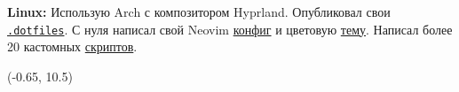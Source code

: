\documentclass[margin,line]{resume}
\begin{document}
\begin{resume}
  \vspace{-6mm}

  \textbf{Linux:} Использую Arch с композитором Hyprland. Опубликовал
  свои
  \href{https:/github.com/alchemmist/.dotfiles}{\texttt{.dotfiles}}.
  С нуля написал свой Neovim
  \href{https://github.com/alchemmist/.dotfiles/tree/main/nvim}{конфиг}
  и цветовую
  \href{https://github.com/alchemmist/nothing.nvim}{тему}.
  Написал более 20 кастомных
  \href{https://github.com/alchemmist/.dotfiles/tree/main/scripts}{скриптов}.

\end{resume}

\begin{minipage}[H]{9.18\textwidth}
  \begin{textblock}{7}(-0.65, 10.5)
    \begingroup
    \hspace{35mm}
    \endgroup
  \end{textblock}

\end{minipage}

\clearpage
\end{document}
